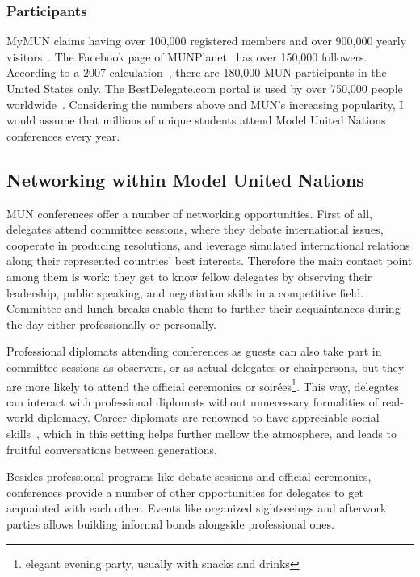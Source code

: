 \subsubsection{Participants}

MyMUN claims having over 100,000 registered members and over 900,000 yearly visitors~\cite{mymunwebsite}. The Facebook page of MUNPlanet~\cite{munplanetfacebook} has over 150,000 followers. According to a 2007 calculation~\cite{howbigismun}, there are 180,000 MUN participants in the United States only. The BestDelegate.com portal is used by over 750,000 people worldwide~\cite{bestdelegate-about}. Considering the numbers above and MUN's increasing popularity, I would assume that millions of unique students attend Model United Nations conferences every year.

\subsection{Networking within Model United Nations}

MUN conferences offer a number of networking opportunities. First of all, delegates attend committee sessions, where they debate international issues, cooperate in producing resolutions, and leverage simulated international relations along their represented countries' best interests. Therefore the main contact point among them is work: they get to know fellow delegates by observing their leadership, public speaking, and negotiation skills in a competitive field. Committee and lunch breaks enable them to further their acquaintances during the day either professionally or personally.

Professional diplomats attending conferences as guests can also take part in committee sessions as observers, or as actual delegates or chairpersons, but they are more likely to attend the official ceremonies or soirées\footnote{elegant evening party, usually with snacks and drinks}. This way, delegates can interact with professional diplomats without unnecessary formalities of real-world diplomacy. Career diplomats are renowned to have appreciable social skills~\cite{fsicapabilities}, which in this setting helps further mellow the atmosphere, and leads to fruitful conversations between generations.

Besides professional programs like debate sessions and official ceremonies, conferences provide a number of other opportunities for delegates to get acquainted with each other. Events like organized sightseeings and afterwork parties allows building informal bonds alongside professional ones.

